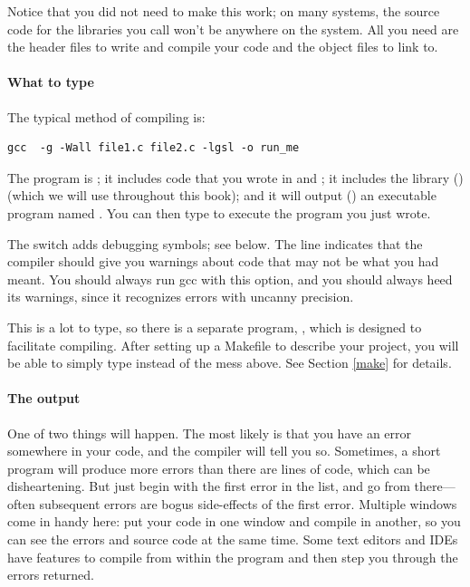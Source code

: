 \documentclass[12pt]{article}
\def\ind#1{\index{#1}#1}
\begin{document}
Notice that you did not need  to make this work;
on many systems, the source code for the libraries you call won't be
anywhere on the system. All you need are the header files to write and
compile your code and the object files to link to.



\paragraph{What to type}
The typical method of compiling is:
\begin{verbatim}
gcc  -g -Wall file1.c file2.c -lgsl -o run_me
\end{verbatim}
The program is ; it includes code that you wrote in
 and ; it includes the library
()  (which we will use throughout this book);
and it will output () an executable program named . You
can then type  to execute the program you just wrote.

The  switch adds \ind{debugging} symbols; see below.  The
 line indicates that the compiler should give you warnings
about code that may not be what you had meant. You should always run
gcc with this option, and you should always heed its warnings, since it
recognizes errors with uncanny precision.

This is a lot to type, so there is a separate program, ,
which is designed to facilitate compiling. After setting up a Makefile
to describe your project, you will be able to simply type  instead
of the mess above. See Section \ref{make} for details.

\paragraph{The output} One of two things will happen. The most likely is
that you have an error somewhere in your code, and the compiler will tell
you so. Sometimes, a short program will produce more errors than there
are lines of code, which can be disheartening. But just begin with the
first error in the list, and go from there---often subsequent errors are
bogus side-effects of the first error. Multiple windows come in handy
here: put your code in one window and compile in another, so you can
see the errors and source code at the same time. Some text editors and
IDEs have features to compile from within the program and then step you
through the errors returned.
\end{document}
